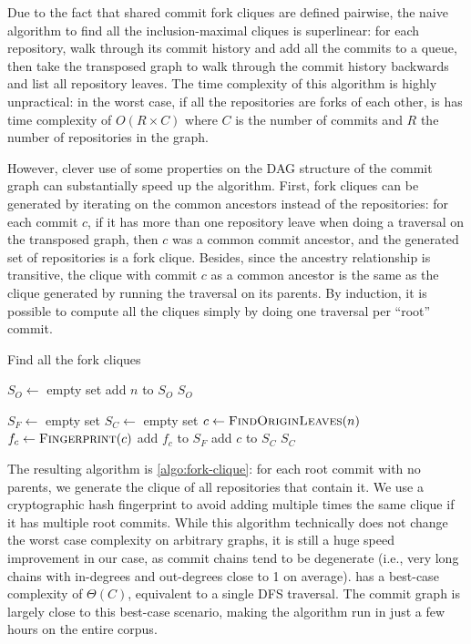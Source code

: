 Due to the fact that shared commit fork cliques are defined pairwise, the naive
algorithm to find all the inclusion-maximal cliques is superlinear: for each
repository, walk through its commit history and add all the commits to a queue,
then take the transposed graph to walk through the commit history backwards and
list all repository leaves. The time complexity of this algorithm is highly
unpractical: in the worst case, if all the repositories are forks of each
other, is has time complexity of $O(R \times C)$ where $C$ is the
number of commits and $R$ the number of repositories in the graph.

However, clever use of some properties on the DAG structure of the commit graph
can substantially speed up the algorithm. First, fork cliques can be generated
by iterating on the common ancestors instead of the repositories: for each
commit $c$, if it has more than one repository leave when doing a traversal on
the transposed graph, then $c$ was a common commit ancestor, and the generated
set of repositories is a fork clique. Besides, since the ancestry relationship
is transitive, the clique with commit $c$ as a common ancestor is the same as
the clique generated by running the traversal on its parents. By induction, it
is possible to compute all the cliques simply by doing one traversal per
``root'' commit.

\begin{algorithm}[t]
  \caption{Find all the fork cliques}%
  \label{algo:fork-clique}
  \begin{algorithmic}
    \State $S_O \gets$ empty set
            \State add $n$ to $S_O$
        \EndIf
    \EndFor
    \State \Return $S_O$
\EndFunction

    \State $S_F \gets$ empty set
    \State $S_C \gets$ empty set
            \State $c \gets \Call{FindOriginLeaves}{n}$
            \State $f_c \gets \Call{Fingerprint}{c}$
                \State add $f_c$ to $S_F$
                \State add $c$ to $S_C$
            \EndIf
        \EndIf
    \EndFor
    \State \Return $S_C$
\EndFunction
\end{algorithmic}
\end{algorithm}

The resulting algorithm is \cref{algo:fork-clique}: for each root commit
with no parents, we generate the clique of all repositories that contain it. We
use a cryptographic hash fingerprint to avoid adding multiple times the same
clique if it has multiple root commits. While this algorithm technically does
not change the worst case complexity on arbitrary graphs, it is still a huge
speed improvement in our case, as commit chains tend to be degenerate (i.e.,
very long chains with in-degrees and out-degrees close to 1 on
average).  has a best-case complexity of
$\Theta(C)$, equivalent to a single DFS traversal. The commit graph is largely
close to this best-case scenario, making the algorithm run in just a few hours
on the entire corpus.

